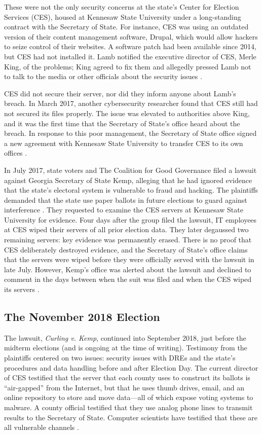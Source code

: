 \documentclass[runningheads]{llncs}
\begin{document}
These were not the only security concerns at the state's Center for Election Services (CES),
housed at Kennesaw State University under a long-standing contract with the Secretary of State.
For instance, CES was using an outdated version of their content management software, Drupal, which would allow hackers to seize control of their websites.
A software patch had been available since 2014, but CES had not installed it.
Lamb notified the executive director of CES, Merle King, of the problems;
King agreed to fix them and allegedly pressed Lamb not to talk to the media or other officials about the
security issues \cite{zetter_will_2017}.

CES did not secure their server, nor did they inform anyone about Lamb's breach.
In March 2017, another cybersecurity researcher found that CES still had not secured its files properly.
The issue was elevated to authorities above King, 
and it was the first time that the Secretary of State's office heard about the breach.
In response to this poor management, the Secretary of State office signed a new agreement with Kennesaw State
University to transfer CES to its own offices \cite{zetter_will_2017}.

In July 2017, state voters and The Coalition for Good Governance filed a lawsuit against Georgia Secretary
of State Kemp, alleging that he had ignored evidence that the state's electoral system is vulnerable to fraud and hacking.
The plaintiffs demanded that the state use paper ballots in future elections to guard against interference \cite{curling_kemp_2018,curling_kemp_amicus_2018}.
They requested to examine the CES servers at Kennesaw State University for evidence.
Four days after the group filed the lawsuit, IT employees at CES wiped their servers of all prior election data.
They later degaussed two remaining servers: key evidence was permanently erased.
There is no proof that CES deliberately destroyed evidence, and the Secretary of
State's office claims that the servers were wiped before they were officially served with the lawsuit in late July.
However, Kemp's office was alerted about the lawsuit and declined to comment in the days between when the suit was filed
and when the CES wiped its servers \cite{stahl_georgia_2017}.

\subsection{The November 2018 Election}

The lawsuit, \emph{Curling v. Kemp}, continued into September 2018, just before the midterm elections (and is ongoing at the time of writing).
Testimony from the plaintiffs centered on two issues:
security issues with DREs and the state's procedures and data handling before and after Election Day.
The current director of CES testified that the server that each county uses to construct its ballots is 
``air-gapped'' from the Internet, but that he uses thumb drives, email, and an online repository to store and move data---all of which expose voting systems to malware.
A county official testified that they use analog phone lines to transmit results to the Secretary of State.
Computer scientists have testified that these are all vulnerable channels \cite{nakashima_georgia_2018}.
\end{document}
